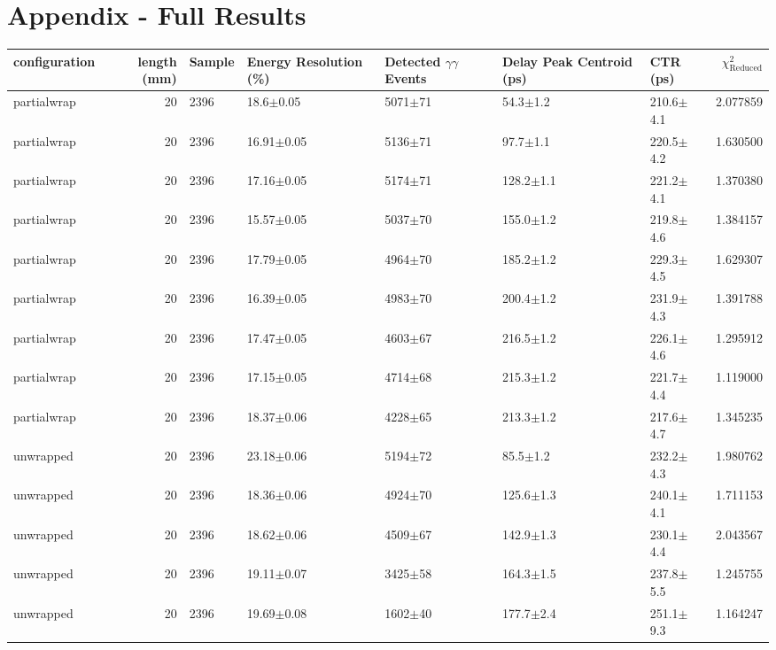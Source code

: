 \section*{Appendix - Full Results}
\begin{tabular}{lrlllllr}
\hline
configuration &  length (mm) & Sample & Energy Resolution (\%) & Detected $\gamma\gamma$ Events & Delay Peak Centroid (ps) & CTR (ps) &  $\chi^2_\text{Reduced}$ \\
\hline
  partialwrap &      20 &    2396 &    18.6$\pm$0.05 &  5071$\pm$71 &    54.3$\pm$1.2 &   210.6$\pm$4.1 &    2.077859 \\
  partialwrap &      20 &    2396 &   16.91$\pm$0.05 &  5136$\pm$71 &    97.7$\pm$1.1 &   220.5$\pm$4.2 &    1.630500 \\
  partialwrap &      20 &    2396 &   17.16$\pm$0.05 &  5174$\pm$71 &   128.2$\pm$1.1 &   221.2$\pm$4.1 &    1.370380 \\
  partialwrap &      20 &    2396 &   15.57$\pm$0.05 &  5037$\pm$70 &   155.0$\pm$1.2 &   219.8$\pm$4.6 &    1.384157 \\
  partialwrap &      20 &    2396 &   17.79$\pm$0.05 &  4964$\pm$70 &   185.2$\pm$1.2 &   229.3$\pm$4.5 &    1.629307 \\
  partialwrap &      20 &    2396 &   16.39$\pm$0.05 &  4983$\pm$70 &   200.4$\pm$1.2 &   231.9$\pm$4.3 &    1.391788 \\
  partialwrap &      20 &    2396 &   17.47$\pm$0.05 &  4603$\pm$67 &   216.5$\pm$1.2 &   226.1$\pm$4.6 &    1.295912 \\
  partialwrap &      20 &    2396 &   17.15$\pm$0.05 &  4714$\pm$68 &   215.3$\pm$1.2 &   221.7$\pm$4.4 &    1.119000 \\
  partialwrap &      20 &    2396 &   18.37$\pm$0.06 &  4228$\pm$65 &   213.3$\pm$1.2 &   217.6$\pm$4.7 &    1.345235 \\
    unwrapped &      20 &    2396 &   23.18$\pm$0.06 &  5194$\pm$72 &    85.5$\pm$1.2 &   232.2$\pm$4.3 &    1.980762 \\
    unwrapped &      20 &    2396 &   18.36$\pm$0.06 &  4924$\pm$70 &   125.6$\pm$1.3 &   240.1$\pm$4.1 &    1.711153 \\
    unwrapped &      20 &    2396 &   18.62$\pm$0.06 &  4509$\pm$67 &   142.9$\pm$1.3 &   230.1$\pm$4.4 &    2.043567 \\
    unwrapped &      20 &    2396 &   19.11$\pm$0.07 &  3425$\pm$58 &   164.3$\pm$1.5 &   237.8$\pm$5.5 &    1.245755 \\
    unwrapped &      20 &    2396 &   19.69$\pm$0.08 &  1602$\pm$40 &   177.7$\pm$2.4 &   251.1$\pm$9.3 &    1.164247 \\

\end{tabular}
